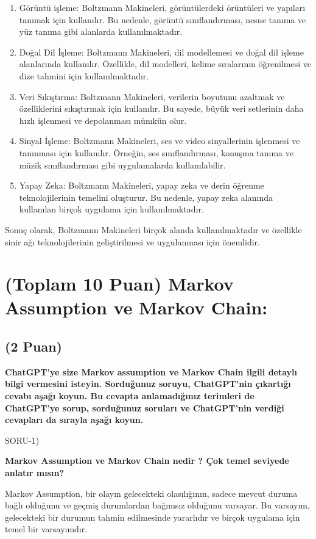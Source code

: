 \documentclass[11pt]{article}
\begin{document}
\begin{enumerate}
    \item 	Görüntü işleme: Boltzmann Makineleri, görüntülerdeki örüntüleri ve yapıları tanımak için kullanılır. Bu nedenle, görüntü sınıflandırması, nesne tanıma ve yüz tanıma gibi alanlarda kullanılmaktadır.
    \item 	Doğal Dil İşleme: Boltzmann Makineleri, dil modellemesi ve doğal dil işleme alanlarında kullanılır. Özellikle, dil modelleri, kelime sıralarının öğrenilmesi ve dize tahmini için kullanılmaktadır.
    \item 	Veri Sıkıştırma: Boltzmann Makineleri, verilerin boyutunu azaltmak ve özelliklerini sıkıştırmak için kullanılır. Bu sayede, büyük veri setlerinin daha hızlı işlenmesi ve depolanması mümkün olur.
    \item 	Sinyal İşleme: Boltzmann Makineleri, ses ve video sinyallerinin işlenmesi ve tanınması için kullanılır. Örneğin, ses sınıflandırması, konuşma tanıma ve müzik sınıflandırması gibi uygulamalarda kullanılabilir.
    \item 	Yapay Zeka: Boltzmann Makineleri, yapay zeka ve derin öğrenme teknolojilerinin temelini oluşturur. Bu nedenle, yapay zeka alanında kullanılan birçok uygulama için kullanılmaktadır.
\end{enumerate}
Sonuç olarak, Boltzmann Makineleri birçok alanda kullanılmaktadır ve özellikle sinir ağı teknolojilerinin geliştirilmesi ve uygulanması için önemlidir.



\section{(Toplam 10 Puan) Markov Assumption ve Markov Chain:}

\subsection{(2 Puan)} \textbf{ChatGPT’ye size Markov assumption ve Markov Chain ilgili detaylı bilgi vermesini isteyin. Sorduğunuz soruyu, ChatGPT'nin çıkartığı cevabı aşağı koyun. Bu cevapta anlamadığınız terimleri de ChatGPT’ye sorup, sorduğunuz soruları ve ChatGPT’nin verdiği cevapları da sırayla aşağı koyun.}

SORU-1)

\textbf{Markov Assumption ve Markov Chain nedir ? Çok temel seviyede anlatır mısın?}

Markov Assumption, bir olayın gelecekteki olasılığının, sadece mevcut duruma bağlı olduğunu ve geçmiş durumlardan bağımsız olduğunu varsayar. Bu varsayım, gelecekteki bir durumun tahmin edilmesinde yararlıdır ve birçok uygulama için temel bir varsayımdır.
\end{document}
